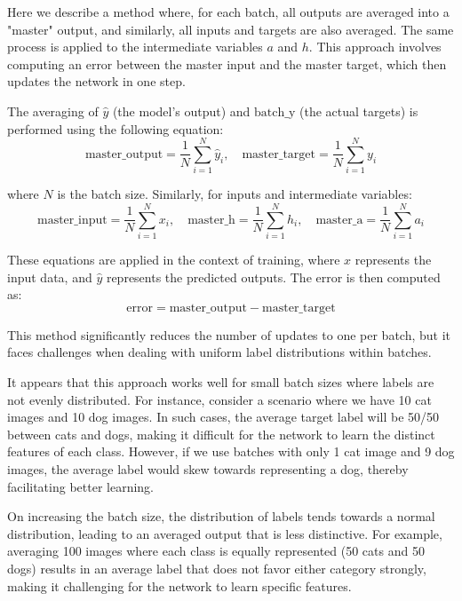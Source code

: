 \documentclass[english]{article}
\begin{document}
Here we describe a method where, for each batch, all outputs are averaged into a "master" output, and similarly, all inputs and targets are also averaged. The same process is applied to the intermediate variables \(a\) and \(h\). This approach involves computing an error between the master input and the master target, which then updates the network in one step.

The averaging of \(\hat y\) (the model's output) and \(\text{batch\_y}\) (the actual targets) is performed using the following equation:
\begin{equation*}
\text{master\_output} = \frac{1}{N} \sum_{i=1}^{N} \hat y_{i}, \quad \text{master\_target} = \frac{1}{N} \sum_{i=1}^{N} y_{i}
\end{equation*}

where \(N\) is the batch size. Similarly, for inputs and intermediate variables:
\begin{equation*}
        \text{master\_input} = \frac{1}{N} \sum_{i=1}^{N} x_i, \quad \text{master\_h}  = \frac{1}{N} \sum_{i=1}^{N} h_i, \quad \text{master\_a}     = \frac{1}{N} \sum_{i=1}^{N} a_i
\end{equation*}

These equations are applied in the context of training, where \(x\) represents the input data, and \(\hat y\) represents the predicted outputs. The error is then computed as:
\[
\text{error} = \text{master\_output} - \text{master\_target}
\]

This method significantly reduces the number of updates to one per batch, but it faces challenges when dealing with uniform label distributions within batches.

It appears that this approach works well for small batch sizes where labels are not evenly distributed. For instance, consider a scenario where we have 10 cat images and 10 dog images. In such cases, the average target label will be 50/50 between cats and dogs, making it difficult for the network to learn the distinct features of each class. However, if we use batches with only 1 cat image and 9 dog images, the average label would skew towards representing a dog, thereby facilitating better learning.

On increasing the batch size, the distribution of labels tends towards a normal distribution, leading to an averaged output that is less distinctive. For example, averaging 100 images where each class is equally represented (50 cats and 50 dogs) results in an average label that does not favor either category strongly, making it challenging for the network to learn specific features. 
\end{document}

